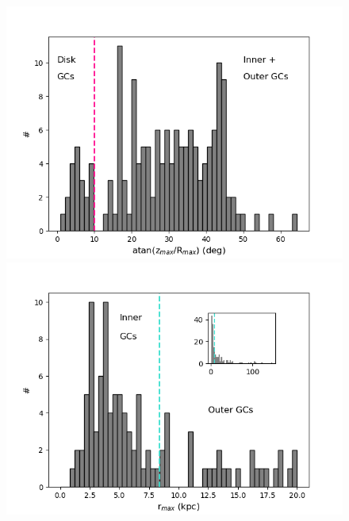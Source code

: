         \twocolumn
        \begin{figure}
            \begin{center}
                \includegraphics[clip=true, trim = 0mm 0mm 0mm 0mm, width=\columnwidth]{images/PII_orbitparams_atanRzmax.png}
                \includegraphics[clip=true, trim = 0mm 0mm 0mm 0mm, width=\columnwidth]{images/PII_orbitparams_rmax_notD.png}


\end{center}
\end{figure}
